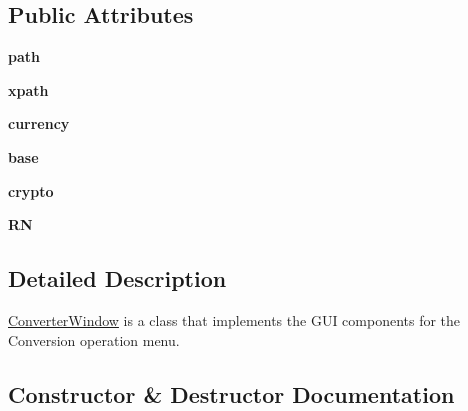 \subsection*{Public Attributes}
\begin{DoxyCompactItemize}
\item 
\mbox{\label{class_conversion__ui_1_1_converter_window_a5ec5f7f6dfc309b53d3913aa68c19d62}} 
{\bfseries path}
\item 
\mbox{\label{class_conversion__ui_1_1_converter_window_a5857c0c4c106f6b4a9e4f432f7bba334}} 
{\bfseries xpath}
\item 
\mbox{\label{class_conversion__ui_1_1_converter_window_a325e2ca2e9f7b127aab5db5fba91cc0c}} 
{\bfseries currency}
\item 
\mbox{\label{class_conversion__ui_1_1_converter_window_ad3285dceff06a5baa0da5e15de409019}} 
{\bfseries base}
\item 
\mbox{\label{class_conversion__ui_1_1_converter_window_ae8518028eb09118845ff07b6f0c61ac1}} 
{\bfseries crypto}
\item 
\mbox{\label{class_conversion__ui_1_1_converter_window_abc4821c75d272db17d4c5adade36e359}} 
{\bfseries RN}
\end{DoxyCompactItemize}


\subsection{Detailed Description}
\hyperlink{class_conversion__ui_1_1_converter_window}{Converter\+Window} is a class that implements the G\+UI components for the Conversion operation menu. 

\subsection{Constructor \& Destructor Documentation}
\mbox{\label{class_conversion__ui_1_1_converter_window_a3ae25e516ec55570394c9a171301dd02}} 
